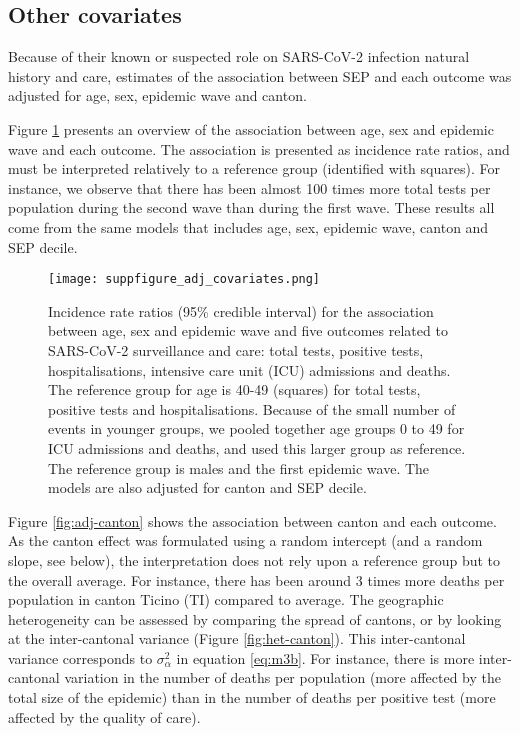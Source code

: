 \documentclass{article}
\begin{document}
	\subsection{Other covariates}
	
	Because of their known or suspected role on SARS-CoV-2 infection natural history and care, estimates of the association between SEP and each outcome was adjusted for age, sex, epidemic wave and canton. 
	
	Figure \ref{fig:adj-cov} presents an overview of the association between age, sex and epidemic wave and each outcome.
	The association is presented as incidence rate ratios, and must be interpreted relatively to a reference group (identified with squares). 
	For instance, we observe that there has been almost 100 times more total tests per population during the second wave than during the first wave.
	These results all come from the same models that includes age, sex, epidemic wave, canton and SEP decile.
	
	
	
	
	\begin{figure}[H]
		\centering
		\texttt{[image: suppfigure\_adj\_covariates.png]}
		\caption{Incidence rate ratios (95\% credible interval) for the association between age, sex and epidemic wave and five outcomes related to SARS-CoV-2 surveillance and care: total tests, positive tests, hospitalisations, intensive care unit (ICU) admissions and deaths. The reference group for age is 40-49 (squares) for total tests, positive tests and hospitalisations. Because of the small number of events in younger groups, we pooled together age groups 0 to 49 for ICU admissions and deaths, and used this larger group as reference. The reference group is males and the first epidemic wave. The models are also adjusted for canton and SEP decile.}
		\label{fig:adj-cov}
	\end{figure}


Figure \ref{fig:adj-canton} shows the association between canton and each outcome. 
As the canton effect was formulated using a random intercept (and a random slope, see below), the interpretation does not rely upon a reference group but to the overall average.
For instance, there has been around 3 times more deaths per population in canton Ticino (TI) compared to average.
The geographic heterogeneity can be assessed by comparing the spread of cantons, or by looking at the inter-cantonal variance (Figure \ref{fig:het-canton}).
This inter-cantonal variance corresponds to $\sigma_{\alpha}^2$ in equation \ref{eq:m3b}.
For instance, there is more inter-cantonal variation in the number of deaths per population (more affected by the total size of the epidemic) than in the number of deaths per positive test (more affected by the quality of care).
\end{document}
